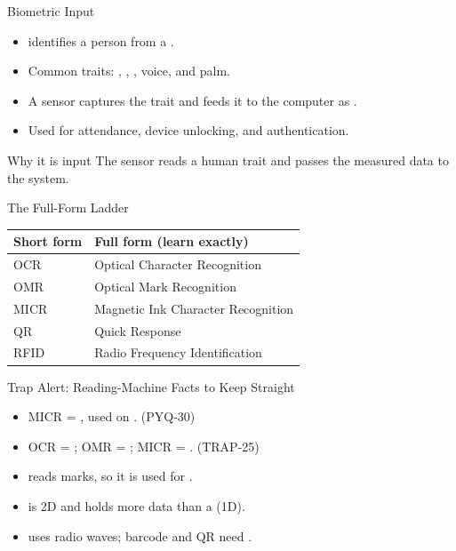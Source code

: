 \documentclass[aspectratio=169]{beamer}
\begin{document}
\begin{frame}{Biometric Input}
  \begin{itemize}
    \item {} identifies a person from a .
    \item Common traits: , , , voice,
      and palm.
    \item A sensor captures the trait and feeds it to the computer as
      .
    \item Used for attendance, device unlocking, and authentication.
  \end{itemize}
  \begin{block}{Why it is input}
    The sensor reads a human trait and passes the measured data to the
    system.
  \end{block}
\end{frame}

\begin{frame}{The Full-Form Ladder}
  \begin{center}
    \begin{tabular}{p{}p{}}
      \toprule
      \textbf{Short form} & \textbf{Full form (learn exactly)} \\
      \midrule
      OCR & Optical Character Recognition \\
      OMR & Optical Mark Recognition \\
      MICR & Magnetic Ink Character Recognition \\
      QR & Quick Response \\
      RFID & Radio Frequency Identification \\
      \bottomrule
    \end{tabular}
  \end{center}
  \vspace{0.25cm}
\end{frame}

\begin{frame}{Trap Alert: Reading-Machine Facts to Keep Straight}
  \begin{itemize}
    \item MICR = , used on . (PYQ-30)
    \item OCR = ; OMR = ; MICR =
      . (TRAP-25)
    \item {} reads marks, so it is used for .
    \item {} is 2D and holds more data than a  (1D).
    \item {} uses radio waves; barcode and QR need .
  \end{itemize}
\end{frame}
\end{document}
